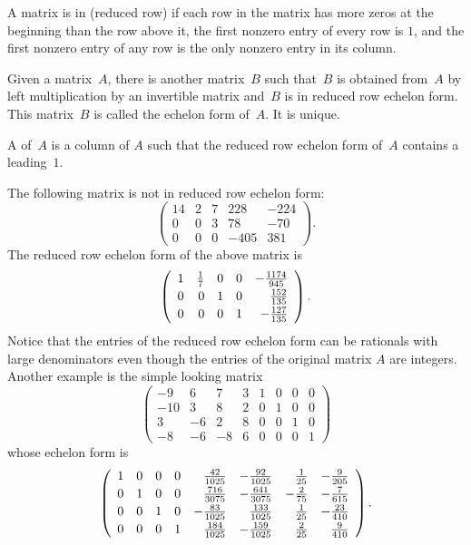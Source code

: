 \begin{definition}
  A matrix is in (reduced row)  if each row in the matrix
  has more zeros at the beginning than the row above it, the first
  nonzero entry of every row is $1$, and the first nonzero entry of
  any row is the only nonzero entry in its column.
\end{definition}

Given a matrix~$A$, there is another matrix~$B$ such that~$B$ is
obtained from~$A$ by left multiplication by an invertible matrix
and~$B$ is in reduced row echelon form.  This matrix~$B$ is called the
echelon form of~$A$.  It is unique.

A  of~$A$ is a column of $A$ such that the reduced
row echelon form of~$A$ contains a leading~$1$.

\begin{example}\label{ex:rref1}
The following matrix is not in reduced row echelon form:
$$
\left(\begin{array}{rrrrr}
14&2&7&228&-224\\
0&0&3&78&-70\\
0&0&0&-405&381
\end{array}\right).
$$
The reduced row echelon form of the above matrix is 
$$
\left(\begin{array}{rrrrr}
1&\frac{1}{7}&0&0&-\frac{1174}{945}\vspace{2pt}\\
0&0&1&0&\frac{152}{135}\vspace{2pt}\\
0&0&0&1&-\frac{127}{135}
\end{array}\right).
$$
Notice that the entries of the reduced row echelon form can be
rationals with large denominators even though the entries of the
original matrix $A$ are integers.  Another example is the simple
looking matrix
$$
\left(\begin{array}{rrrrrrrr}
-9&6&7&3&1&0&0&0\\
-10&3&8&2&0&1&0&0\\
3&-6&2&8&0&0&1&0\\
-8&-6&-8&6&0&0&0&1
\end{array}\right)
$$
whose echelon form is 
$$
\left(\begin{array}{rrrrrrrr}
1&0&0&0&\frac{42}{1025}&-\frac{92}{1025}&\frac{1}{25}&-\frac{9}{205}\vspace{2pt}\\
0&1&0&0&\frac{716}{3075}&-\frac{641}{3075}&-\frac{2}{75}&-\frac{7}{615}\vspace{2pt}\\
0&0&1&0&-\frac{83}{1025}&\frac{133}{1025}&\frac{1}{25}&-\frac{23}{410}\vspace{2pt}\\
0&0&0&1&\frac{184}{1025}&-\frac{159}{1025}&\frac{2}{25}&\frac{9}{410}
\end{array}\right).
$$
\end{example}

